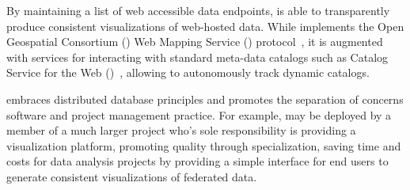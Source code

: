 By maintaining a list of web accessible data endpoints, \sciwms{} is
able to transparently produce consistent visualizations of web-hosted
data. While \sciwms{} implements the Open Geospatial Consortium (\ogc{})
Web Mapping Service (\wms{}) protocol~\cite{wms14}, it is augmented
with services for interacting with standard meta-data catalogs such as
Catalog Service for the Web (\csw{})~\cite{csw14}, allowing \sciwms{}
to autonomously track dynamic catalogs. 


\sciwms{} embraces distributed database principles and promotes the
separation of concerns software and project management practice. For
example, \sciwms{} may be deployed by a member of a much larger
project who's sole responsibility is providing a visualization
platform, promoting quality through specialization, saving time and
costs for data analysis projects by providing a simple interface for
end users to generate consistent visualizations of federated data.
